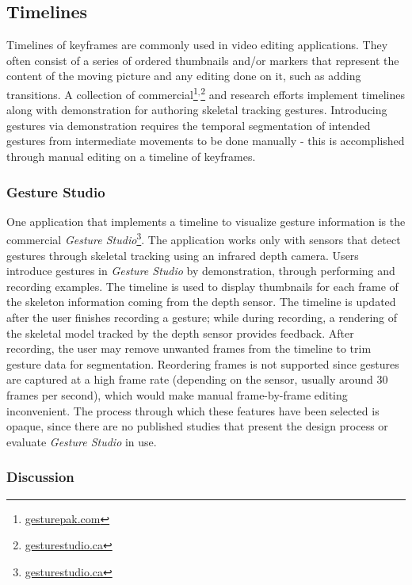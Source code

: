 \subsection{Timelines}

Timelines of keyframes are commonly used in video editing applications. They often consist of a series of ordered thumbnails and/or markers that represent the content of the moving picture and any editing done on it, such as adding transitions. A collection of commercial\footnote{\href{http://www.gesturepak.com}{gesturepak.com}}$^{,}$\footnote{\href{http://www.gesturestudio.ca}{gesturestudio.ca}} and research \parencite{Tang:2013} efforts implement timelines along with demonstration for authoring skeletal tracking gestures. Introducing gestures via demonstration requires the temporal segmentation of intended gestures from intermediate movements to be done manually - this is accomplished through manual editing on a timeline of keyframes.

\subsubsection{Gesture Studio}

One application that implements a timeline to visualize gesture information is the commercial \emph{Gesture Studio}\footnote{\href{http://www.gesturestudio.ca}{gesturestudio.ca}}. The application works only with sensors that detect gestures through skeletal tracking using an infrared depth camera. Users introduce gestures in \emph{Gesture Studio} by demonstration, through performing and recording examples. The timeline is used to display thumbnails for each frame of the skeleton information coming from the depth sensor. The timeline is updated after the user finishes recording a gesture; while during recording, a rendering of the skeletal model tracked by the depth sensor provides feedback. After recording, the user may remove unwanted frames from the timeline to trim gesture data for segmentation. Reordering frames is not supported since gestures are captured at a high frame rate (depending on the sensor, usually around 30 frames per second), which would make manual frame-by-frame editing inconvenient. The process through which these features have been selected is opaque, since there are no published studies that present the design process or evaluate \emph{Gesture Studio} in use.

\subsubsection{Discussion}

